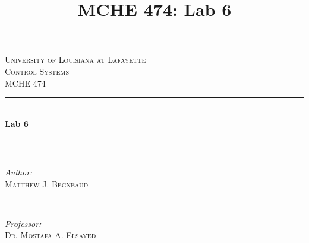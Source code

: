 \documentclass[12pt]{article}
\title{MCHE 474: Lab 6}
\begin{document}




\begin{titlepage}

\newcommand{\HRule}{\rule{\linewidth}{0.5mm}} %

\center %
 

\textsc{\LARGE University of Louisiana at Lafayette}\\[1.5cm] %
\textsc{\Large Control Systems}\\[0.5cm] %
\textsc{\large MCHE 474}\\[0.5cm] %


\HRule \\[0.4cm]
{ \huge \bfseries Lab 6}\\[0.4cm] %
\HRule \\[1.5cm]
 

\begin{minipage}{0.4\textwidth}
\begin{flushleft} \large
\emph{Author:}\\
\textsc{Matthew J. Begneaud} \\%
\end{flushleft}
\end{minipage}
~
\begin{minipage}{0.4\textwidth}
\begin{flushright} \large
\emph{Professor:} \\
\textsc{Dr. Mostafa A. Elsayed} %
\end{flushright}
\end{minipage}\\[1.5cm]


\end{titlepage}
\end{document}
